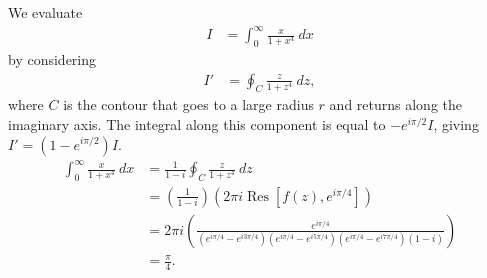 \documentclass[10pt]{mypackage}
\DeclareMathOperator{\res}{Res}
\begin{document}
\begin{solution}[21.16]

\end{solution}
\begin{solution}[21.17]
  We evaluate
  \begin{align*}
    I &= \int_{0}^{\infty} \frac{x}{1 + x^4}\:dx
  \end{align*}
  by considering 
  \begin{align*}
    I' &= \oint_{C}\frac{z}{1 + z^4}\:dz,
  \end{align*}
  where $C$ is the contour that goes to a large radius $r$ and returns along the imaginary axis. The integral along this component is equal to $-e^{i\pi/2} I$, giving $I' = \left( 1 - e^{i\pi/2} \right)I$.
  \begin{align*}
    \int_{0}^{\infty} \frac{x}{1 + x^4}\:dx &= \frac{1}{1 - i}\oint_{C}\frac{z}{1 + z^{4}}\:dz\\
                                            &= \left( \frac{1}{1 - i} \right)\left( 2\pi i \res\left[ f(z),e^{i\pi/4} \right] \right)\\
                                            &= 2\pi i \left( \frac{e^{i\pi/4}}{\left( e^{i\pi/4} - e^{i3\pi/4} \right)\left( e^{i\pi/4} - e^{i5\pi/4} \right)\left( e^{i\pi/4} - e^{i7\pi/4} \right)\left( 1 - i \right)} \right)\\
                                            &= \frac{\pi}{4}.
  \end{align*}
\end{solution}
\begin{solution}[21.22]

\end{solution}
\end{document}
